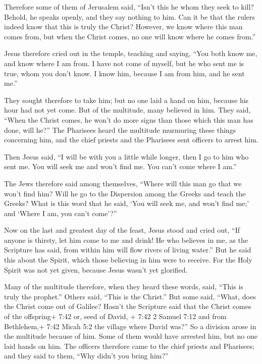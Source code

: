  Therefore some of them of Jerusalem said, ``Isn't this he
whom they seek to kill?  Behold, he speaks openly, and they
say nothing to him. Can it be that the rulers indeed know that this is
truly the Christ?  However, we know where this man comes
from, but when the Christ comes, no one will know where he comes from.''

 Jesus therefore cried out in the temple, teaching and
saying, ``You both know me, and know where I am from. I have not come of
myself, but he who sent me is true, whom you don't know.  I
know him, because I am from him, and he sent me.''

 They sought therefore to take him; but no one laid a hand
on him, because his hour had not yet come.  But of the
multitude, many believed in him. They said, ``When the Christ comes, he
won't do more signs than those which this man has done, will he?''
 The Pharisees heard the multitude murmuring these things
concerning him, and the chief priests and the Pharisees sent officers to
arrest him.

 Then Jesus said, ``I will be with you a little while
longer, then I go to him who sent me.  You will seek me and
won't find me. You can't come where I am.''

 The Jews therefore said among themselves, ``Where will
this man go that we won't find him? Will he go to the Dispersion among
the Greeks and teach the Greeks?  What is this word that he
said, `You will seek me, and won't find me;' and `Where I am, you can't
come'?''

 Now on the last and greatest day of the feast, Jesus stood
and cried out, ``If anyone is thirsty, let him come to me and drink!
 He who believes in me, as the Scripture has said, from
within him will flow rivers of living water.''  But he said
this about the Spirit, which those believing in him were to receive. For
the Holy Spirit was not yet given, because Jesus wasn't yet glorified.

 Many of the multitude therefore, when they heard these
words, said, ``This is truly the prophet.''  Others said,
``This is the Christ.'' But some said, ``What, does the Christ come out
of Galilee?  Hasn't the Scripture said that the Christ
comes of the offspring+ 7:42 or, seed of David, + 7:42 2 Samuel 7:12 and
from Bethlehem,+ 7:42 Micah 5:2 the village where David was?''
 So a division arose in the multitude because of him.
 Some of them would have arrested him, but no one laid
hands on him.  The officers therefore came to the chief
priests and Pharisees; and they said to them, ``Why didn't you bring
him?''

